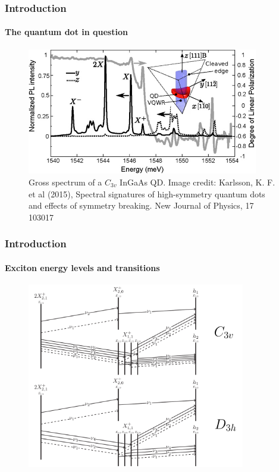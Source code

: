 \documentclass[english]{beamer}
\begin{document}
  \begin{frame}
  	\frametitle{Introduction}
  	\framesubtitle{The quantum dot in question}
  	
  	\begin{figure}
	\centering
    		\includegraphics[width=0.9\textwidth]{images/QD_schematic}
    		\caption{Gross spectrum of a $C_{3v}$ InGaAs QD. Image credit: Karlsson, K. F. et al (2015), Spectral signatures of high-symmetry quantum dots and effects of symmetry breaking. New Journal of Physics, 17 103017}
    		\label{fig:qd}
	\end{figure}
\end{frame}

	\begin{frame}
		\frametitle{Introduction}
		\framesubtitle{Exciton energy levels and transitions}
		\begin{figure}
	\centering
    		\includegraphics[width=0.85\textwidth]{images/2X21_scheme}
    		\label{fig:qd}
	\end{figure}
		
	
	
	\end{frame}
  
\end{document}
